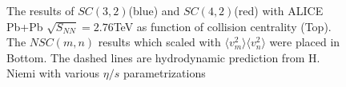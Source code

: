 	
 	\begin{figure}[!p]
		\begin{center}
        \caption{The results of $SC(3,2)$(blue) and $SC(4,2)$(red) with ALICE Pb+Pb $\sqrt{S_{NN}}=2.76$TeV as function of collision centrality (Top). The $NSC(m,n)$ results which scaled with $\langle v_m^2 \rangle \langle v_n^2 \rangle $ were placed in Bottom. The dashed lines are hydrodynamic prediction from H. Niemi with various $\eta / s$ parametrizations \cite{Niemi:2015qia}  }
        \label{figs:sc}
        \end{center}   
     \end{figure}

